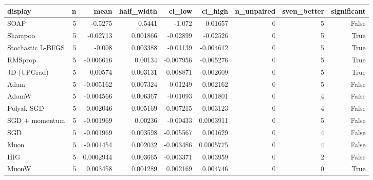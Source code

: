 \begin{tabular}{lrrrrrrrr}
\toprule
display & n & mean & half\_width & ci\_low & ci\_high & n\_unpaired & sven\_better & significant \\
\midrule
SOAP & 5 & -0.5275 & 0.5441 & -1.072 & 0.01657 & 0 & 5 & False \\
Shampoo & 5 & -0.02713 & 0.001866 & -0.02899 & -0.02526 & 0 & 5 & True \\
Stochastic L-BFGS & 5 & -0.008 & 0.003388 & -0.01139 & -0.004612 & 0 & 5 & True \\
RMSprop & 5 & -0.006616 & 0.00134 & -0.007956 & -0.005276 & 0 & 5 & True \\
JD (UPGrad) & 5 & -0.00574 & 0.003131 & -0.008871 & -0.002609 & 0 & 5 & True \\
Adam & 5 & -0.005162 & 0.007324 & -0.01249 & 0.002162 & 0 & 5 & False \\
AdamW & 5 & -0.004566 & 0.006367 & -0.01093 & 0.001801 & 0 & 4 & False \\
Polyak SGD & 5 & -0.002046 & 0.005169 & -0.007215 & 0.003123 & 0 & 4 & False \\
SGD + momentum & 5 & -0.001969 & 0.00236 & -0.00433 & 0.0003911 & 0 & 5 & False \\
SGD & 5 & -0.001969 & 0.003598 & -0.005567 & 0.001629 & 0 & 4 & False \\
Muon & 5 & -0.001454 & 0.002032 & -0.003486 & 0.0005775 & 0 & 4 & False \\
HIG & 5 & 0.0002944 & 0.003665 & -0.003371 & 0.003959 & 0 & 2 & False \\
MuonW & 5 & 0.003458 & 0.001289 & 0.002169 & 0.004746 & 0 & 0 & True \\
\bottomrule
\end{tabular}
